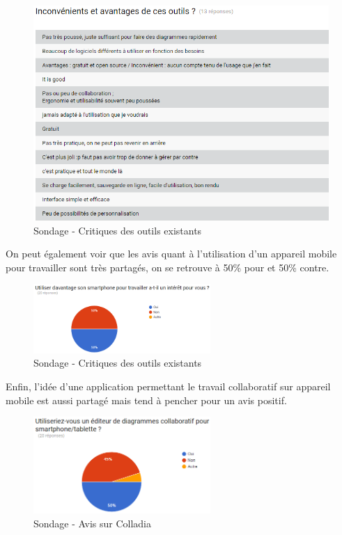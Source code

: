 \documentclass[a4paper,11pt]{article}
\begin{document}
\begin{figure}[!h]
	\centering
	\includegraphics[width=\textwidth]{img/sondage_critique}
	\caption{Sondage - Critiques des outils existants}
\end{figure}
\vspace{200pt}
  

On peut également voir que les avis quant à l'utilisation d'un appareil mobile pour travailler sont très partagés, on se retrouve à 50\% pour et 50\% contre.


\begin{figure}[!h]
	\centering
	\includegraphics[width=0.6\textwidth]{img/sondage_smartphone}
	\caption{Sondage - Critiques des outils existants}
\end{figure}

\vspace{200pt}

Enfin, l'idée d'une application permettant le travail collaboratif sur appareil mobile est aussi partagé mais tend à pencher pour un avis positif.

\begin{figure}[h]
	\centering
	\includegraphics[width=0.6\textwidth]{img/sondage_colladia}
	\caption{Sondage - Avis sur Colladia}
\end{figure}
\end{document}
